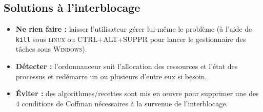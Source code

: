 \documentclass[10pt,firamath,cours]{nsi}
\begin{document}
\subsection{Solutions à l'interblocage}
\begin{itemize}
	\item 	\textbf{Ne rien faire :} laisser l'utilisateur gérer lui-même le problème (à l'aide de \texttt{kill} sous \textsc{linux} ou CTRL+ALT+SUPPR pour lancer le gestionnaire des tâches sous \textsc{Windows}).
	\item 	\textbf{Détecter :}  l’ordonnanceur suit l’allocation des ressources et l’état des processus et redémarre un ou plusieurs d’entre eux si besoin.
    \item \textbf{\'Eviter :} des algorithmes/recettes sont mis en œuvre pour supprimer une des 4 conditions de Coffman nécessaires à la survenue de l’interblocage.
\end{itemize}
\end{document}
